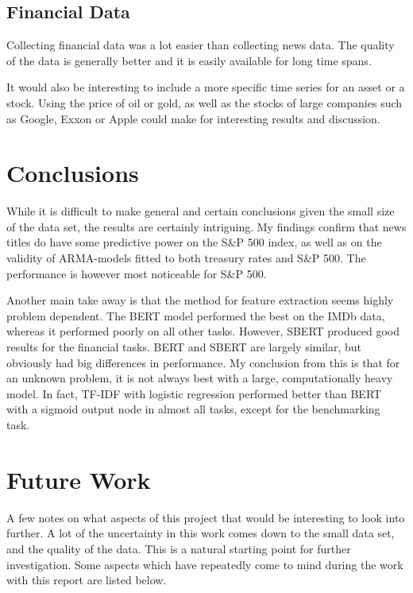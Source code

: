 \subsection{Financial Data}

Collecting financial data was a lot easier than collecting news data. The quality of the data is generally better and it is easily available for long time spans. 

It would also be interesting to include a more specific time series for an asset or a stock. Using the price of oil or gold, as well as the stocks of large companies such as Google, Exxon or Apple could make for interesting results and discussion. 

\section{Conclusions}

While it is difficult to make general and certain conclusions given the small size of the data set, the results are certainly intriguing. My findings confirm that news titles do have some predictive power on the S\&P 500 index, as well as on the validity of ARMA-models fitted to both treasury rates and S\&P 500. The performance is however most noticeable for S\&P 500. 

Another main take away is that the method for feature extraction seems highly problem dependent. The BERT model performed the best on the IMDb data, whereas it performed poorly on all other tasks. However, SBERT produced good results for the financial tasks. BERT and SBERT are largely similar, but obviously had big differences in performance. My conclusion from this is that for an unknown problem, it is not always best with a large, computationally heavy model. In fact, TF-IDF with logistic regression performed better than BERT with a sigmoid output node in almost all tasks, except for the benchmarking task. 



\section{Future Work}

A few notes on what aspects of this project that would be interesting to look into further. A lot of the uncertainty in this work comes down to the small data set, and the quality of the data. This is a natural starting point for further investigation. Some aspects which have repeatedly come to mind during the work with this report are listed below. 

